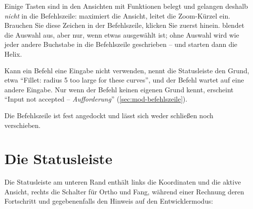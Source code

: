\begin{warnung}
Einige Tasten sind in den Ansichten mit Funktionen belegt und gelangen deshalb \emph{nicht} in
die Befehlszeile:  maximiert die Ansicht,  leitet die Zoom-Kürzel ein.
Brauchen Sie diese Zeichen in der Befehlszeile, klicken Sie zuerst hinein.  blendet die Auswahl aus, aber nur, wenn etwas ausgewählt ist; ohne Auswahl wird
 wie jeder andere Buchstabe in die Befehlszeile geschrieben --  und
 starten dann die Helix.
\end{warnung}

Kann ein Befehl eine Eingabe nicht verwenden, nennt die Statusleiste den Grund, etwa
\enquote{Fillet: radius 5 too large for these curves}, und der Befehl wartet auf eine andere
Eingabe. Nur wenn der Befehl keinen eigenen Grund kennt, erscheint \enquote{Input not accepted
-- \textit{Aufforderung}} (\autoref{sec:mod-befehlszeile}).

Die Befehlszeile ist fest angedockt und lässt sich weder schließen noch verschieben.

\section{Die Statusleiste}\label{sec:statusleiste}

Die Statusleiste am unteren Rand enthält links die Koordinaten und die aktive Ansicht, rechts
die Schalter für Ortho und Fang, während einer Rechnung deren Fortschritt und gegebenenfalls
den Hinweis auf den Entwicklermodus:

